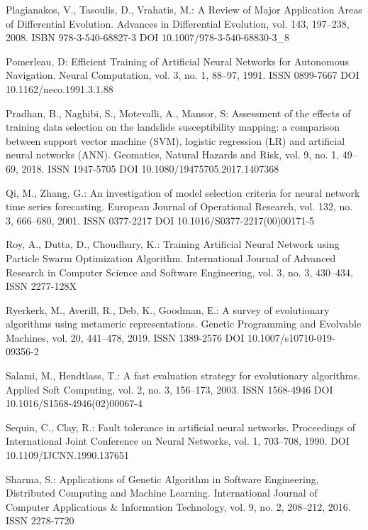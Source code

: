 \begin{thebibliography}{99.}
 Plagianakos, V., Tasoulis, D., Vrahatis, M.: A Review of Major Application Areas of Differential Evolution. Advances in Differential Evolution, vol. 143, 197--238, 2008. ISBN 978-3-540-68827-3 DOI 10.1007/978-3-540-68830-3\_8

 Pomerleau, D: Efficient Training of Artificial Neural Networks for Autonomous Navigation. Neural Computation, vol. 3, no. 1, 88--97, 1991. ISSN 0899-7667 DOI 10.1162/neco.1991.3.1.88

 Pradhan, B., Naghibi, S., Motevalli, A., Mansor, S: Assessment of the effects of training data selection on the landslide susceptibility mapping: a comparison between support vector machine (SVM), logistic regression (LR) and artificial neural networks (ANN). Geomatics, Natural Hazards and Risk, vol. 9, no. 1, 49--69, 2018. ISSN 1947-5705 DOI 10.1080/19475705.2017.1407368

 Qi, M., Zhang, G.: An investigation of model selection criteria for neural network time series forecasting. European Journal of Operational Research, vol. 132, no. 3, 666--680, 2001. ISSN 0377-2217 DOI 10.1016/S0377-2217(00)00171-5

 Roy, A., Dutta, D., Choudhury, K.: Training Artificial Neural Network using Particle Swarm Optimization Algorithm. International Journal of Advanced Research in Computer Science and Software Engineering, vol. 3, no. 3, 430--434, ISSN 2277-128X

 Ryerkerk, M., Averill, R., Deb, K., Goodman, Е.: A survey of evolutionary algorithms using metameric representations. Genetic Programming and Evolvable Machines, vol. 20, 441--478, 2019. ISSN 1389-2576 DOI 10.1007/s10710-019-09356-2

 Salami, M., Hendtlass, T.: A fast evaluation strategy for evolutionary algorithms. Applied Soft Computing, vol. 2, no. 3, 156--173, 2003. ISSN 1568-4946 DOI 10.1016/S1568-4946(02)00067-4

 Sequin, C., Clay, R.: Fault tolerance in artificial neural networks. Proceedings of International Joint Conference on Neural Networks, vol. 1, 703--708, 1990. DOI 10.1109/IJCNN.1990.137651

 Sharma, S.: Applications of Genetic Algorithm in Software Engineering, Distributed Computing and Machine Learning. International Journal of Computer Applications \& Information Technology, vol. 9, no. 2, 208--212, 2016. ISSN 2278-7720


\end{thebibliography}
